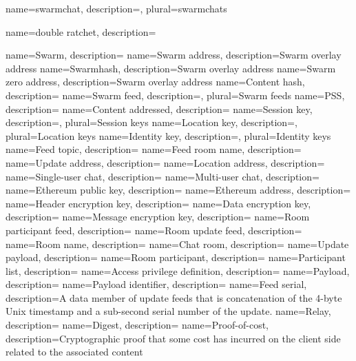 {
	name={swarmchat},
	description={},
	plural={swarmchats}
}

{
	name={double ratchet},
	description={}
}

{
	name={Swarm},
	description={}
}
{
	name={Swarm address},
	description={Swarm overlay address}
}
{
	name={Swarmhash},
	description={Swarm overlay address}
}
{
	name={Swarm zero address},
	description={Swarm overlay address}
}
{
	name={Content hash},
	description={}
}
{
	name={Swarm feed},
	description={},
	plural={Swarm feeds}
}
{
	name={PSS},
	description={}
}
{
	name={Content addressed},
	description={}
}
{
	name={Session key},
	description={},
	plural={Session keys}
}
{
	name={Location key},
	description={},
	plural={Location keys}
}
{
	name={Identity key},
	description={},
	plural={Identity keys}
}
{
	name={Feed topic},
	description={}
}
{
	name={Feed room name},
	description={}
}
{
	name={Update address},
	description={}
}
{
	name={Location address},
	description={}
}
{
	name={Single-user chat},
	description={}
}
{
	name={Multi-user chat},
	description={}
}
{
	name={Ethereum public key},
	description={}
}
{
	name={Ethereum address},
	description={}
}
{
	name={Header encryption key},
	description={}
}
{
	name={Data encryption key},
	description={}
}
{
	name={Message encryption key},
	description={}
}
{
	name={Room participant feed},
	description={}
}
{
	name={Room update feed},
	description={}
}
{
	name={Room name},
	description={}
}
{
	name={Chat room},
	description={}
}
{
	name={Update payload},
	description={}
}
{
	name={Room participant},
	description={}
}
{
	name={Participant list},
	description={}
}
{
	name={Access privilege definition},
	description={}
}
{
	name={Payload},
	description={}
}
{
	name={Payload identifier},
	description={}
}
{
	name={Feed serial},
	description={A data member of update feeds that is concatenation of the 4-byte Unix timestamp and a sub-second serial number of the update.}
}
{
	name={Relay},
	description={}
}
{
	name={Digest},
	description={}
}
{
	name={Proof-of-cost},
	description={Cryptographic proof that some cost has incurred on the client side related to the associated content}
}
